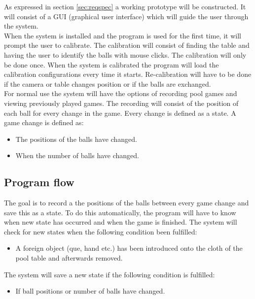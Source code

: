 As expressed in section \ref{sec:reqspec} a working prototype will be constructed. It will consist of a GUI (graphical user interface) which will guide the user through the system.\\

When the system is installed and the program is used for the first time, it will prompt the user to calibrate. The calibration will consist of finding the table and having the user to identify the balls with mouse clicks. The calibration will only be done once. When the system is calibrated the program will load the calibration configurations every time it starts. Re-calibration will have to be done if the camera or table changes position or if the balls are exchanged.\\

For normal use the system will have the options of recording pool games and viewing previously played games. The recording will consist of the position of each ball for every change in the game. Every change is defined as a state. A game change is defined as:\\ 
\begin{itemize}
	\item The positions of the balls have changed.
	\item When the number of balls have changed.
\end{itemize}

\subsection{Program flow}
The goal is to record a the positions of the balls between every game change and save this as a state. To do this automatically, the program will have to know when new state has occurred and when the game is finished. The system will check for new states when the following condition been fulfilled:

\begin{itemize}
	\item  A foreign object (que, hand etc.) has been introduced onto the cloth of the pool table and afterwards removed.
\end{itemize}

The system will save a new state if the following condition is fulfilled:

\begin{itemize}
	\item If ball positions or number of balls have changed.
\end{itemize}


